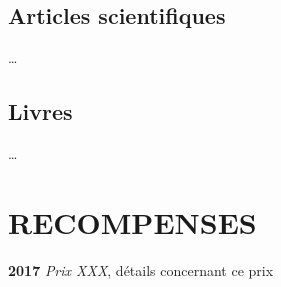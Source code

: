 \documentclass[10pt,]{article}
\begin{document}
\subsection{\texorpdfstring{\textbf{Articles
scientifiques}}{Articles scientifiques}}\label{articles-scientifiques}

\ldots{}

\subsection{\texorpdfstring{\textbf{Livres}}{Livres}}\label{livres}

\ldots{}

\section{RECOMPENSES}\label{recompenses}

\textbf{2017} \emph{Prix XXX}, détails concernant ce prix
\end{document}
